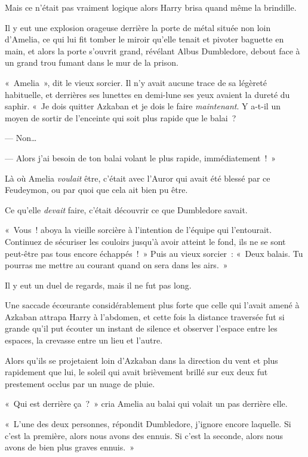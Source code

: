 Mais ce n'était pas vraiment logique alors Harry brisa quand même la brindille.

\later

Il y eut une explosion orageuse derrière la porte de métal située non loin d'Amelia, ce qui lui fit tomber le miroir qu'elle tenait et pivoter baguette en main, et alors la porte s'ouvrit grand, révélant Albus Dumbledore, debout face à un grand trou fumant dans le mur de la prison.

«~Amelia~», dit le vieux sorcier. Il n'y avait aucune trace de sa légèreté habituelle, et derrières ses lunettes en demi-lune ses yeux avaient la dureté du saphir. «~Je dois quitter Azkaban et je dois le faire \emph{maintenant}. Y a-t-il un moyen de sortir de l'enceinte qui soit plus rapide que le balai~?

--- Non…

--- Alors j'ai besoin de ton balai volant le plus rapide, immédiatement~!~»

Là où Amelia \emph{voulait} être, c'était avec l'Auror qui avait été blessé par ce Feudeymon, ou par quoi que cela ait bien pu être.

Ce qu'elle \emph{devait} faire, c'était découvrir ce que Dumbledore savait.

«~Vous~! aboya la vieille sorcière à l'intention de l'équipe qui l'entourait. Continuez de sécuriser les couloirs jusqu'à avoir atteint le fond, ils ne se sont peut-être pas tous encore échappés~!~» Puis au vieux sorcier~: «~Deux balais. Tu pourras me mettre au courant quand on sera dans les airs.~»

Il y eut un duel de regards, mais il ne fut pas long.

\later

Une saccade écœurante considérablement plus forte que celle qui l'avait amené à Azkaban attrapa Harry à l'abdomen, et cette fois la distance traversée fut si grande qu'il put écouter un instant de silence et observer l'espace entre les espaces, la crevasse entre un lieu et l'autre.

\later

Alors qu'ils se projetaient loin d'Azkaban dans la direction du vent et plus rapidement que lui, le soleil qui avait brièvement brillé sur eux deux fut prestement occlus par un nuage de pluie.

«~Qui est derrière ça~?~» cria Amelia au balai qui volait un pas derrière elle.

«~L'une des deux personnes, répondit Dumbledore, j'ignore encore laquelle. Si c'est la première, alors nous avons des ennuis. Si c'est la seconde, alors nous avons de bien plus graves ennuis.~»


